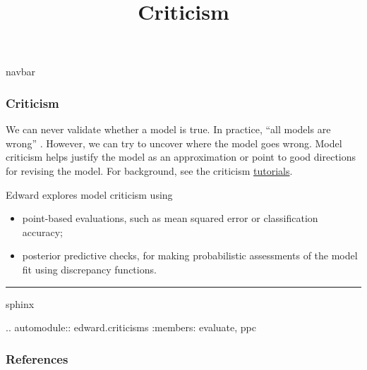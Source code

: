 \title{Criticism}

{{navbar}}

\subsubsection{Criticism}

We can never validate whether a model is true. In practice, ``all
models are wrong'' \citep{box1976science}. However, we can try to
uncover where the model goes wrong. Model criticism helps justify the
model as an approximation or point to good directions for revising the
model.
For background, see the criticism \href{/tutorials/}{tutorials}.

Edward explores model criticism using
\begin{itemize}
  \item point-based evaluations, such as mean squared error or
  classification accuracy;
  \item posterior predictive checks, for making probabilistic
  assessments of the model fit using discrepancy functions.
\end{itemize}





\begin{center}\rule{3in}{0.4pt}\end{center}

{{sphinx

.. automodule:: edward.criticisms
   :members: evaluate,
             ppc

}}

\subsubsection{References}\label{references}
